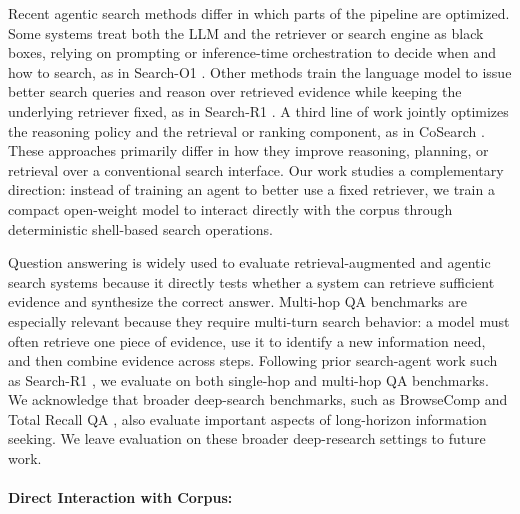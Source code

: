 \documentclass{article} %
\begin{document}
Recent agentic search methods differ in which parts of the pipeline are optimized. Some systems treat both the LLM and the retriever or search engine as black boxes, relying on prompting or inference-time orchestration to decide when and how to search, as in Search-O1 \citep{search-o1}. Other methods train the language model to issue better search queries and reason over retrieved evidence while keeping the underlying retriever fixed, as in Search-R1 \citep{search-r1}. A third line of work jointly optimizes the reasoning policy and the retrieval or ranking component, as in CoSearch \citep{zeng2026cosearch}. These approaches primarily differ in how they improve reasoning, planning, or retrieval over a conventional search interface. Our work studies a complementary direction: instead of training an agent to better use a fixed retriever, we train a compact open-weight model to interact directly with the corpus through deterministic shell-based search operations.

Question answering is widely used to evaluate retrieval-augmented and agentic search systems because it directly tests whether a system can retrieve sufficient evidence and synthesize the correct answer. Multi-hop QA benchmarks are especially relevant because they require multi-turn search behavior: a model must often retrieve one piece of evidence, use it to identify a new information need, and then combine evidence across steps. Following prior search-agent work such as Search-R1 \citep{search-r1}, we evaluate on both single-hop and multi-hop QA benchmarks. We acknowledge that broader deep-search benchmarks, such as BrowseComp \citep{wei2025browsecomp} and Total Recall QA \citep{rafiee2026totalrecallqaverifiable}, also evaluate important aspects of long-horizon information seeking. We leave evaluation on these broader deep-research settings to future work.



\paragraph{Direct Interaction with Corpus:} 
\end{document}
